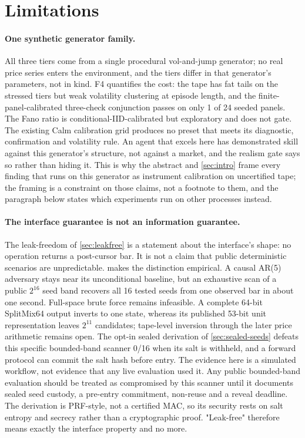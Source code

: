 \section{Limitations}\label{sec:limitations}

\paragraph{One synthetic generator family.} All three tiers come from a single procedural vol-and-jump generator; no real price series enters the environment, and the tiers differ in that generator's parameters, not in kind. F4 quantifies the cost: the tape has fat tails on the stressed tiers but weak volatility clustering at episode length, and the finite-panel-calibrated three-check conjunction passes on only 1 of 24 seeded panels. The Fano ratio is conditional-IID-calibrated but exploratory and does not gate. The existing Calm calibration grid produces no preset that meets its diagnostic, confirmation and volatility rule. An agent that excels here has demonstrated skill against this generator's structure, not against a market, and the realism gate says so rather than hiding it. This is why the abstract and \cref{sec:intro} frame every finding that runs on this generator as instrument calibration on uncertified tape; the framing is a constraint on those claims, not a footnote to them, and the paragraph below states which experiments run on other processes instead.

\paragraph{The interface guarantee is not an information guarantee.} The leak-freedom of \cref{sec:leakfree} is a statement about the interface's shape: no operation returns a post-cursor bar. It is not a claim that public deterministic scenarios are unpredictable.  makes the distinction empirical. A causal AR(5) adversary stays near its unconditional baseline, but an exhaustive scan of a public $2^{16}$ seed band recovers all 16 tested seeds from one observed bar in about one second. Full-space brute force remains infeasible. A complete 64-bit SplitMix64 output inverts to one state, whereas its published 53-bit unit representation leaves $2^{11}$ candidates; tape-level inversion through the later price arithmetic remains open. The opt-in sealed derivation of \cref{sec:sealed-seeds} defeats this specific bounded-band scanner 0/16 when its salt is withheld, and a forward protocol can commit the salt hash before entry. The evidence here is a simulated workflow, not evidence that any live evaluation used it. Any public bounded-band evaluation should be treated as compromised by this scanner until it documents sealed seed custody, a pre-entry commitment, non-reuse and a reveal deadline. The derivation is PRF-style, not a certified MAC, so its security rests on salt entropy and secrecy rather than a cryptographic proof. "Leak-free" therefore means exactly the interface property and no more.

